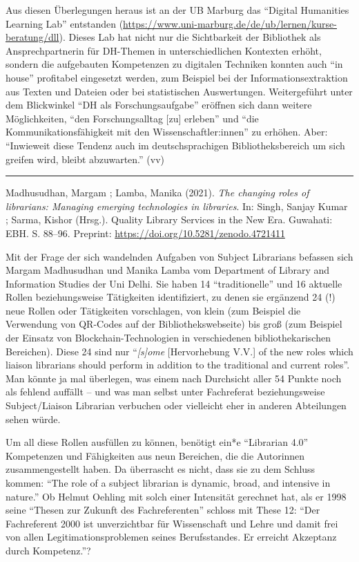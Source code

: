\documentclass[a4paper,
fontsize=11pt,
oneside,
numbers=noperiodatend,
parskip=half-,
bibliography=totoc,
final
]{scrartcl}
\begin{document}
Aus diesen Überlegungen heraus ist an der UB Marburg das
\enquote{Digital Humanities Learning Lab} entstanden
(\url{https://www.uni-marburg.de/de/ub/lernen/kurse-beratung/dll}).
Dieses Lab hat nicht nur die Sichtbarkeit der Bibliothek als
Ansprechpartnerin für DH-Themen in unterschiedlichen Kontexten erhöht,
sondern die aufgebauten Kompetenzen zu digitalen Techniken konnten auch
\enquote{in house} profitabel eingesetzt werden, zum Beispiel bei der
Informationsextraktion aus Texten und Dateien oder bei statistischen
Auswertungen. Weitergeführt unter dem Blickwinkel \enquote{DH als
Forschungsaufgabe} eröffnen sich dann weitere Möglichkeiten,
\enquote{den Forschungsalltag {[}zu{]} erleben} und \enquote{die
Kommunikationsfähigkeit mit den Wissenschaftler:innen} zu erhöhen. Aber:
\enquote{Inwieweit diese Tendenz auch im deutschsprachigen
Bibliotheksbereich um sich greifen wird, bleibt abzuwarten.} (vv)

\begin{center}\rule{0.5\linewidth}{0.5pt}\end{center}

Madhusudhan, Margam ; Lamba, Manika (2021). \emph{The changing roles of
librarians: Managing emerging technologies in libraries}. In: Singh,
Sanjay Kumar ; Sarma, Kishor (Hrsg.). Quality Library Services in the
New Era. Guwahati: EBH. S. 88--96. Preprint:
\url{https://doi.org/10.5281/zenodo.4721411}

Mit der Frage der sich wandelnden Aufgaben von Subject Librarians
befassen sich Margam Madhusudhan und Manika Lamba vom Department of
Library and Information Studies der Uni Delhi. Sie haben 14
\enquote{traditionelle} und 16 aktuelle Rollen beziehungsweise
Tätigkeiten identifiziert, zu denen sie ergänzend 24 (!) neue Rollen
oder Tätigkeiten vorschlagen, von klein (zum Beispiel die Verwendung von
QR-Codes auf der Bibliothekswebseite) bis groß (zum Beispiel der Einsatz
von Blockchain-Technologien in verschiedenen bibliothekarischen
Bereichen). Diese 24 sind nur \enquote{\emph{{[}s{]}ome} {[}Hervorhebung
V.V.{]} of the new roles which liaison librarians should perform in
addition to the traditional and current roles}. Man könnte ja mal
überlegen, was einem nach Durchsicht aller 54 Punkte noch als fehlend
auffällt -- und was man selbst unter Fachreferat beziehungsweise
Subject/Liaison Librarian verbuchen oder vielleicht eher in anderen
Abteilungen sehen würde.

Um all diese Rollen ausfüllen zu können, benötigt ein*e
\enquote{Librarian 4.0} Kompetenzen und Fähigkeiten aus neun Bereichen,
die die Autorinnen zusammengestellt haben. Da überrascht es nicht, dass
sie zu dem Schluss kommen: \enquote{The role of a subject librarian is
dynamic, broad, and intensive in nature.} Ob Helmut Oehling mit solch
einer Intensität gerechnet hat, als er 1998 seine \enquote{Thesen zur
Zukunft des Fachreferenten} schloss mit These 12: \enquote{Der
Fachreferent 2000 ist unverzichtbar für Wissenschaft und Lehre und damit
frei von allen Legitimationsproblemen seines Berufsstandes. Er erreicht
Akzeptanz durch Kompetenz.}?
\end{document}
